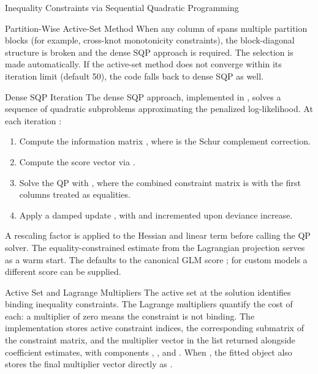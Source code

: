 \begin{Section}{Inequality Constraints via Sequential Quadratic Programming}
\begin{SubSection}{Partition-Wise Active-Set Method}
When any column of  spans multiple partition blocks
(for example, cross-knot monotonicity constraints), the block-diagonal
structure is broken and the dense SQP approach is required. The
selection is made automatically. If the active-set method does not
converge within its iteration limit (default 50), the code falls back
to dense SQP as well.
\end{SubSection}


%
\begin{SubSection}{Dense SQP Iteration}
The dense SQP approach, implemented in ,
solves a sequence of quadratic subproblems approximating the penalized
log-likelihood. At each iteration :
\begin{enumerate}

\item{} Compute the information matrix
,
where  is the Schur complement correction.
\item{} Compute the score vector via .
\item{} Solve the QP with , where the
combined constraint matrix is
 with the first  columns
treated as equalities.
\item{} Apply a damped update
, with
 and  incremented upon deviance
increase.

\end{enumerate}

A rescaling factor
 is applied
to the Hessian and linear term before calling the QP solver. The
equality-constrained estimate from the Lagrangian projection serves as
a warm start. The  defaults to the canonical GLM
score
; for custom
models a different score can be supplied.
\end{SubSection}


%
\begin{SubSection}{Active Set and Lagrange Multipliers}
The active set at the solution identifies binding inequality constraints.
The Lagrange multipliers quantify the cost of each: a multiplier of zero
means the constraint is not binding. The implementation stores active
constraint indices, the corresponding submatrix of the constraint matrix,
and the multiplier vector in the  list returned alongside
coefficient estimates, with components , ,
and . When
, the fitted object also stores
the final multiplier vector directly as .


\end{SubSection}
\end{Section}
